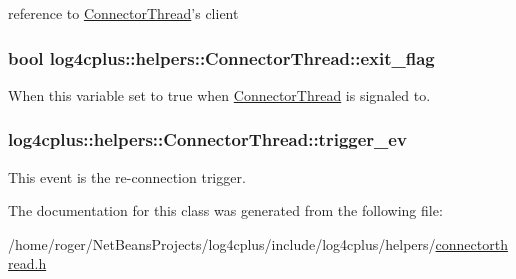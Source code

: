 reference to \hyperlink{classlog4cplus_1_1helpers_1_1ConnectorThread}{Connector\-Thread}'s client 

\hypertarget{classlog4cplus_1_1helpers_1_1ConnectorThread_af1141ad4cbbfa7fbd9035975e0c74a03}{
\subsubsection[{exit\-\_\-flag}]{\setlength{\rightskip}{0pt plus 5cm}bool log4cplus\-::helpers\-::\-Connector\-Thread\-::exit\-\_\-flag\hspace{0.3cm}{\ttfamily [protected]}}}\label{classlog4cplus_1_1helpers_1_1ConnectorThread_af1141ad4cbbfa7fbd9035975e0c74a03}


When this variable set to true when \hyperlink{classlog4cplus_1_1helpers_1_1ConnectorThread}{Connector\-Thread} is signaled to. 

\hypertarget{classlog4cplus_1_1helpers_1_1ConnectorThread_a9c417c4e798183677abaa3c7a6c9f006}{
\subsubsection[{trigger\-\_\-ev}]{ log4cplus\-::helpers\-::\-Connector\-Thread\-::trigger\-\_\-ev\hspace{0.3cm}{\ttfamily [protected]}}}\label{classlog4cplus_1_1helpers_1_1ConnectorThread_a9c417c4e798183677abaa3c7a6c9f006}


This event is the re-\/connection trigger. 



The documentation for this class was generated from the following file\-:\begin{DoxyCompactItemize}
\item 
/home/roger/\-Net\-Beans\-Projects/log4cplus/include/log4cplus/helpers/\hyperlink{connectorthread_8h}{connectorthread.\-h}\end{DoxyCompactItemize}
